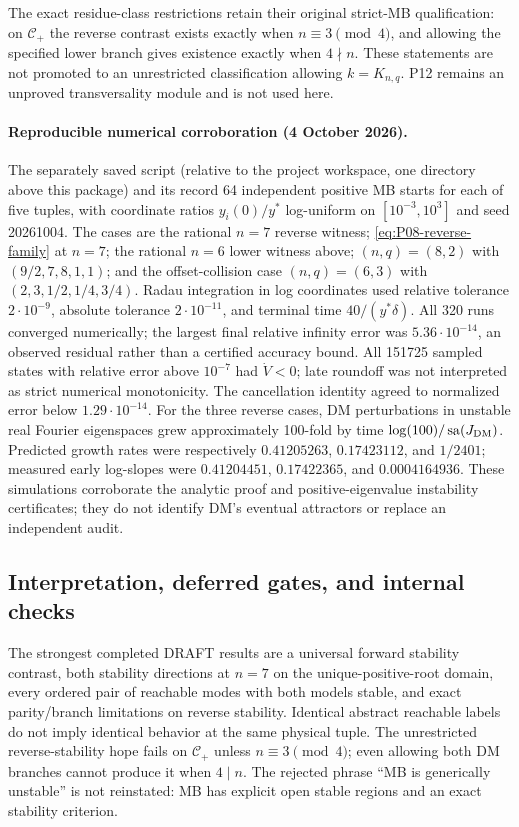 The exact residue-class restrictions retain their original strict-MB
qualification: on $\mathcal C_+$ the reverse contrast exists exactly
when $n\equiv3\pmod4$, and allowing the specified lower branch gives
existence exactly when $4\nmid n$. These statements are not promoted
to an unrestricted classification allowing $k=K_{n,q}$.
P12 remains an unproved transversality module and is not used here.

\paragraph{Reproducible numerical corroboration (4 October 2026).}
The separately saved script
 (relative to the
project workspace, one directory above this package) and its
 record 64 independent positive MB starts for each
of five tuples, with coordinate ratios $y_i(0)/y^*$ log-uniform on
$[10^{-3},10^3]$ and seed 20261004. The cases are the rational $n=7$
reverse witness; \eqref{eq:P08-reverse-family} at $n=7$; the rational
$n=6$ lower witness above; $(n,q)=(8,2)$ with $(9/2,7,8,1,1)$;
and the offset-collision case $(n,q)=(6,3)$ with $(2,3,1/2,1/4,3/4)$.
Radau integration in log coordinates used relative tolerance $2\cdot10^{-9}$,
absolute tolerance $2\cdot10^{-11}$, and terminal time $40/(y^*\delta)$.
All 320 runs converged numerically; the largest final relative infinity
error was $5.36\cdot10^{-14}$, an observed residual rather than a
certified accuracy bound. All 151725 sampled states with relative
error above $10^{-7}$ had $\dot V<0$; late roundoff was not interpreted
as strict numerical monotonicity. The cancellation identity agreed
to normalized error below $1.29\cdot10^{-14}$.
For the three reverse cases, DM perturbations in unstable real Fourier
eigenspaces grew approximately 100-fold by time $\log(100)/\operatorname{sa}(J_{\mathrm{DM}})$.
Predicted growth rates were respectively $0.41205263$, $0.17423112$,
and $1/2401$; measured early log-slopes were $0.41204451$,
$0.17422365$, and $0.0004164936$. These simulations corroborate the
analytic proof and positive-eigenvalue instability certificates; they
do not identify DM's eventual attractors or replace an independent audit.

\subsection{Interpretation, deferred gates, and internal checks}
\label{slot:P08-6}
The strongest completed DRAFT results are a universal forward stability
contrast, both stability directions at $n=7$ on the unique-positive-root
domain, every ordered pair of reachable modes with both models stable,
and exact parity/branch limitations on reverse stability. Identical
abstract reachable labels do not imply identical behavior at the same
physical tuple. The unrestricted reverse-stability hope fails on
$\mathcal C_+$ unless $n\equiv3\pmod4$; even allowing both DM
branches cannot produce it when $4\mid n$.
The rejected phrase ``MB is generically unstable'' is not reinstated:
MB has explicit open stable regions and an exact stability criterion.


